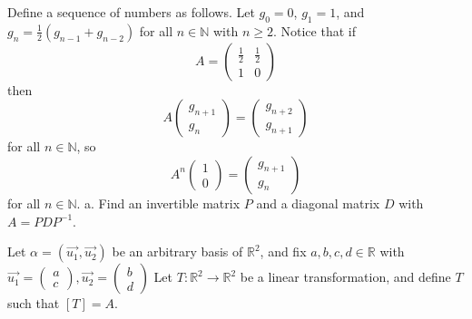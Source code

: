 \documentclass[12pt]{article}
\newenvironment{problem}[2][Problem]
{
	\begin{trivlist} 
		\item[\hskip \labelsep {\bfseries #1 #2:}]
	}
{
	\end{trivlist}
	}
\newenvironment{solution}[1][Solution]
{
	\begin{trivlist} 
		\item[\hskip \labelsep {\itshape #1:}]
	}
	{
	\end{trivlist}
}
\begin{document}
\newpage
\begin{problem}{2}
Define a sequence of numbers as follows. Let $g_{0}=0$, $g_{1}=1$, and $g_{n}= \frac{1}{2} (g_{n-1} + g_{n-2})$ for all $n \in \mathbb{N}$ with $n \geq 2$. Notice that if
\[
A = \begin{pmatrix} \frac{1}{2} & \frac{1}{2} \\ 1 & 0 \end{pmatrix}
\]
then
\[
A\begin{pmatrix} g_{n+1}\\g_{n} \end{pmatrix} = \begin{pmatrix} g_{n+2}\\g_{n+1} \end{pmatrix}
\]
for all $n\in \mathbb{N}$, so
\[
A^{n} \begin{pmatrix}1\\0\end{pmatrix} = \begin{pmatrix} g_{n+1}\\g_{n} \end{pmatrix}
\]
for all $n\in \mathbb{N}$.
\noindent
\newline
\newline
a. Find an invertible matrix $P$ and a diagonal matrix $D$ with $A=PDP^{-1}$.
\begin{solution}
%
%
%
%
%
%
Let $\alpha=(\vec{u_{1}},\vec{u_{2}})$ be an arbitrary basis of $\mathbb{R}^2$, and fix $a,b,c,d \in \mathbb{R}$ with $\vec{u_{1}} = \begin{pmatrix}a\\c\end{pmatrix}, \vec{u_{2}} = \begin{pmatrix}b\\d\end{pmatrix}$ Let $T :\mathbb{R}^2 \to \mathbb{R}^2$ be a linear transformation, and define $T$ such that $[T]=A$.

\end{solution}
\end{problem}
\end{document}
